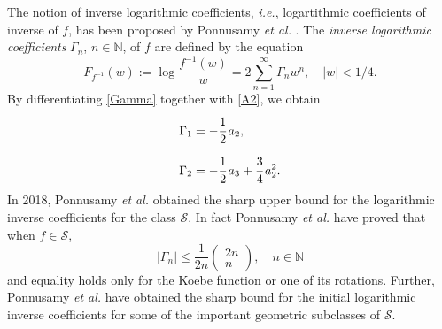 \documentclass[a4paper,12pt]{amsart}
\theoremstyle{definition}
\numberwithin{equation}{section}
\begin{document}




\medskip
The notion of inverse logarithmic coefficients, {\em i.e.}, logartithmic coefficients of inverse of $f$, has been proposed by Ponnusamy {\it et al.} \cite{samyinverselog}. The {\it inverse logarithmic
 coefficients} $\Gamma_n$, $n \in \mathbb{N}$, of $f$ are defined by the equation
\begin{equation}\label{Gamma}
	F_{f^{-1}}(w):= \log\frac{f^{-1}(w)}{w}=2\sum\limits_{n=1}^{\infty}\Gamma_{n}w^{n}, \quad |w|<1/4.
\end{equation}
By differentiating \eqref{Gamma} together with \eqref{A2}, we obtain
\begin{equation}\label{Gammaaa}
\begin{aligned}
& \Gamma_{1}=-\cfrac{1}{2}\,a_2,\\[2mm]
& \Gamma_2=-\cfrac{1}{2}\, a_3+\cfrac{3}{4}\, a_2^2.
\end{aligned}
\end{equation}
In 2018, Ponnusamy {\it et al.} \cite{samyinverselog} obtained the sharp upper bound  for the logarithmic inverse coefficients for the class $\mathcal{S}$. In fact Ponnusamy {\it et al.} \cite{samyinverselog} have proved that when $f\in \mathcal{S}$, $$|\Gamma_n| \leq \frac{1}{2n}
  \left(
  \begin{matrix}
    2n \\
    n
  \end{matrix}
  \right),
  \quad n \in \mathbb{N}
$$
and equality holds only for the Koebe function or one of its rotations. Further, Ponnusamy {\it et al.} \cite{samyinverselog} have obtained the sharp bound for the initial logarithmic inverse coefficients for some of the important geometric subclasses of $
\mathcal{S}$.\\
\end{document}
